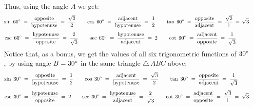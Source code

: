 \begin{exmp}
 Thus, using the angle $A$ we get:
 \begin{displaymath}
  \sin\;60\Degrees \;=\; \dfrac{\text{opposite}}{\text{hypotenuse}} \;=\; \dfrac{\sqrt{3}}{2} \qquad
  \cos\;60\Degrees \;=\; \dfrac{\text{adjacent}}{\text{hypotenuse}} \;=\; \dfrac{1}{2} \qquad
  \tan\;60\Degrees \;=\; \dfrac{\text{opposite}}{\text{adjacent}} \;=\; \dfrac{\sqrt{3}}{1} \,=\,
   \sqrt{3}\vspace{2mm}
 \end{displaymath}
 \begin{displaymath}
  \csc\;60\Degrees \;=\; \dfrac{\text{hypotenuse}}{\text{opposite}} \;=\; \dfrac{2}{\sqrt{3}} \qquad
  \sec\;60\Degrees \;=\; \dfrac{\text{hypotenuse}}{\text{adjacent}} \;=\; 2 \qquad
  \cot\;60\Degrees \;=\; \dfrac{\text{adjacent}}{\text{opposite}} \;=\;
   \dfrac{1}{\sqrt{3}}~\quad\quad\vspace{2mm}
 \end{displaymath}
 Notice that, as a bonus, we get the values of all six trigonometric functions of $30^\circ$, by
 using angle $B = 30^\circ$ in the same triangle $\triangle\,ABC$ above:
 \begin{displaymath}
  \sin\;30\Degrees \;=\; \dfrac{\text{opposite}}{\text{hypotenuse}} \;=\; \dfrac{1}{2} \qquad
  \cos\;30\Degrees \;=\; \dfrac{\text{adjacent}}{\text{hypotenuse}} \;=\; \dfrac{\sqrt{3}}{2} \qquad
  \tan\;30\Degrees \;=\; \dfrac{\text{opposite}}{\text{adjacent}} \;=\;
   \dfrac{1}{\sqrt{3}}\quad\quad\vspace{2mm}
 \end{displaymath}
 \begin{displaymath}
  \csc\;30\Degrees \;=\; \dfrac{\text{hypotenuse}}{\text{opposite}} \;=\; 2 \qquad
  \sec\;30\Degrees \;=\; \dfrac{\text{hypotenuse}}{\text{adjacent}} \;=\; \dfrac{2}{\sqrt{3}} \qquad
  \cot\;30\Degrees \;=\; \dfrac{\text{adjacent}}{\text{opposite}} \;=\;
   \dfrac{\sqrt{3}}{1} \;=\; \sqrt{3}\vspace{2mm}
 \end{displaymath}
\end{exmp}\vspace{-7mm}

